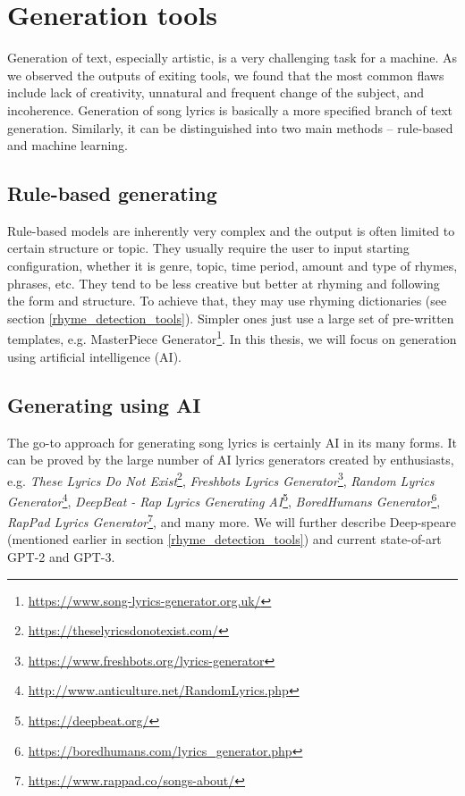 \section{Generation tools}\label{generation_tools}

Generation of text, especially artistic, is a very challenging task for a machine. As we observed the outputs of exiting tools, we found that the most common flaws include lack of creativity, unnatural and frequent change of the subject, and incoherence. Generation of song lyrics is basically a more specified branch of text generation. Similarly, it can be distinguished into two main methods -- rule-based and machine learning. 

\subsection{Rule-based generating}
Rule-based models are inherently very complex and the output is often limited to certain structure or topic. They usually require the user to input starting configuration, whether it is genre, topic, time period, amount and type of rhymes, phrases, etc. They tend to be less creative but better at rhyming and following the form and structure. To achieve that, they may use rhyming dictionaries (see section \ref{rhyme_detection_tools}). Simpler ones just use a large set of pre-written templates, e.g. MasterPiece Generator\footnote{\url{https://www.song-lyrics-generator.org.uk/}}. In this thesis, we will focus on generation using artificial intelligence (AI).

\subsection{Generating using AI}
The go-to approach for generating song lyrics is certainly AI in its many forms. It can be proved by the large number of AI lyrics generators created by enthusiasts, e.g. \textit{These Lyrics Do Not Exist}\footnote{\url{https://theselyricsdonotexist.com/}}, \textit{Freshbots Lyrics Generator}\footnote{\url{https://www.freshbots.org/lyrics-generator}}, \textit{Random Lyrics Generator}\footnote{\url{http://www.anticulture.net/RandomLyrics.php}}, \textit{DeepBeat - Rap Lyrics Generating AI}\footnote{\url{https://deepbeat.org/}}, \textit{BoredHumans Generator}\footnote{\url{https://boredhumans.com/lyrics_generator.php}}, \textit{RapPad Lyrics Generator}\footnote{\url{https://www.rappad.co/songs-about/}}, and many more. We will further describe Deep-speare (mentioned earlier in section \ref{rhyme_detection_tools}) and current state-of-art GPT-2 and GPT-3.

